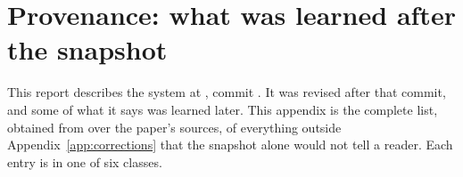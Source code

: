 \section{Provenance: what was learned after the snapshot}
\label{app:provenance}

This report describes the system at , commit . It was revised after
that commit, and some of what it says was learned later. This appendix is the complete list,
obtained from  over the paper's sources, of everything outside
Appendix~\ref{app:corrections} that the snapshot alone would not tell a reader. Each entry is in one of six classes.

